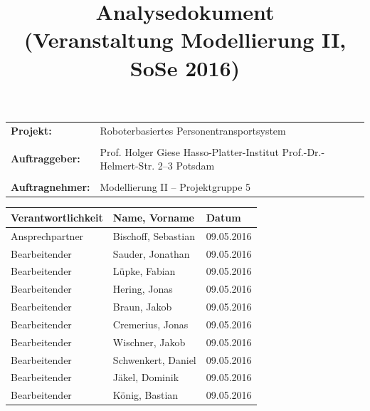 \documentclass[includeheaders]{scrartcl}
\begin{document}
	

	\newpage

	\title{Analysedokument\\ \small{(Veranstaltung Modellierung II, SoSe 2016)}}
	\date{}
	\author{}

	\maketitle
	\begin{table}[H]
		\centering
		\begin{tabular}{@{}lp{7.5cm}@{}}
			\textbf{Projekt:} & Roboterbasiertes Personentransportsystem\\
			&\\
			\textbf{Auftraggeber: }& Prof. Holger Giese \newline Hasso-Platter-Institut \newline Prof.-Dr.-Helmert-Str. 2–3 \newline 14482 Potsdam\\
			&\\
			\textbf{Auftragnehmer: }& Modellierung II – Projektgruppe 5 \\
		\end{tabular}
	\end{table}



	\newpage

	\begin{table}[H]
		\centering
		\begin{tabularx}{\textwidth}{@{}p{4cm}Xp{4cm}@{}}
			\toprule
			Verantwortlichkeit & Name, Vorname & Datum \\
			\midrule
			Ansprechpartner    & Bischoff, Sebastian & 09.05.2016 \\
			Bearbeitender      & Sauder, Jonathan & 09.05.2016 \\
			Bearbeitender      & Lüpke, Fabian & 09.05.2016 \\
			Bearbeitender      & Hering, Jonas & 09.05.2016 \\
			Bearbeitender      & Braun, Jakob & 09.05.2016  \\
			Bearbeitender      & Cremerius, Jonas & 09.05.2016 \\
			Bearbeitender      & Wischner, Jakob & 09.05.2016 \\
			Bearbeitender      & Schwenkert, Daniel & 09.05.2016 \\
			Bearbeitender      & Jäkel, Dominik & 09.05.2016 \\
			Bearbeitender      & König, Bastian & 09.05.2016 \\
			\bottomrule
		\end{tabularx}
	\end{table}
\end{document}
